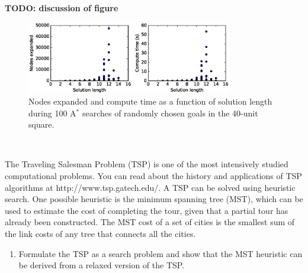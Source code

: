 \documentclass[12pt]{article}
\newenvironment{problem}[2][Problem]{\begin{trivlist}
\item[\hskip \labelsep {\bfseries #1}\hskip \labelsep {\bfseries #2.}]}{\end{trivlist}}
\begin{document}
\begin{problem}{5}
\begin{enumerate}
			\vspace{0.25cm}
			\textbf{TODO: discussion of figure}
			\begin{figure}[h]
				\centering
				\includegraphics[width=0.8\textwidth]{fig/p5_h_4_max_20_iter_100_seed_0.eps}
				\caption{Nodes expanded and compute time as a function of solution length during 100 A$^*$ searches of randomly chosen goals in the 40-unit square.}
				\label{fig:p5graph}
			\end{figure} \\
	\end{enumerate}
\end{problem}
\begin{problem}{6}
	The Traveling Salesman Problem (TSP) is one of the most intensively studied computational problems.
	You can read about the history and applications of TSP algorithms at http://www.tsp.gatech.edu/.
	A TSP can be solved using heuristic search.
	One possible heuristic is the minimum spanning tree (MST), which can be used to estimate the cost of completing the tour, given that a partial tour has already been constructed.
	The MST cost of a set of cities is the smallest sum of the link costs of any tree that connects all the cities.
	\begin{enumerate}
		\item Formulate the TSP as a search problem and show that the MST heuristic can be derived from a relaxed version of the TSP.
	\end{enumerate}
\end{problem}
\end{document}
